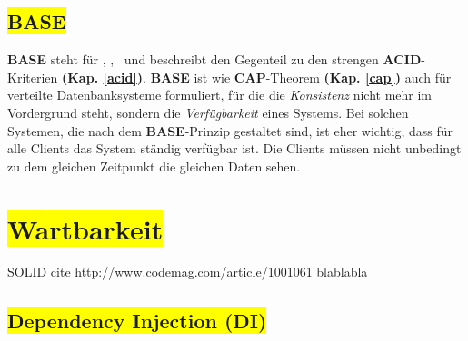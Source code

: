 %



\subsection{\colorbox{yellow}{BASE}}\label{base}

\textbf{BASE} steht für \BAse, \baSe, \basE\ und beschreibt den Gegenteil zu den strengen \textbf{ACID}-Kriterien \textbf{(Kap. \ref{acid})}. \textbf{BASE} ist wie \textbf{CAP}-Theorem \textbf{(Kap. \ref{cap})} auch für verteilte Datenbanksysteme formuliert, für die die \textit{Konsistenz} nicht mehr im Vordergrund steht, sondern die \textit{Verfügbarkeit} eines Systems. Bei solchen Systemen, die nach dem \textbf{BASE}-Prinzip gestaltet sind, ist eher wichtig, dass für alle Clients das System ständig verfügbar ist. Die Clients müssen nicht unbedingt zu dem gleichen Zeitpunkt die gleichen Daten sehen.


\section{\colorbox{yellow}{Wartbarkeit}}\label{maintenance}
 SOLID  cite http://www.codemag.com/article/1001061
blablabla

\subsection{\colorbox{yellow}{Dependency Injection (DI)}}\label{di}

